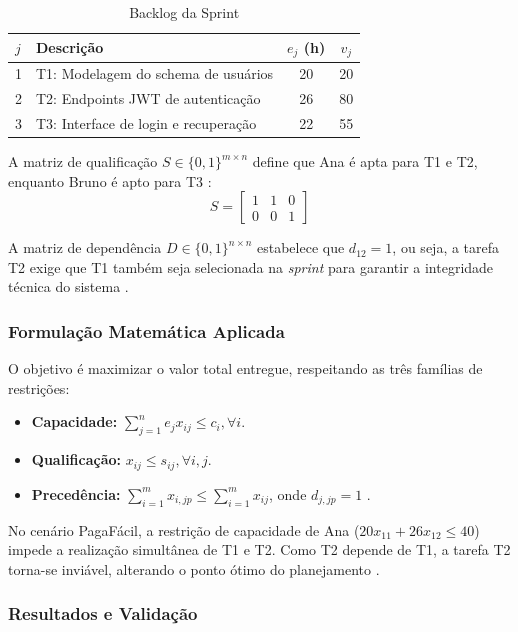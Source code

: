 \documentclass[12pt]{article}
\begin{document}
\begin{table}[h]
\centering
\caption{Backlog da Sprint}
\label{tab:backlog}
\begin{tabular}{llcc}
\hline
$j$ & Descrição & $e_j$ (h) & $v_j$ \\ \hline
1   & T1: Modelagem do schema de usuários & 20        & 20    \\
2   & T2: Endpoints JWT de autenticação   & 26        & 80    \\
3   & T3: Interface de login e recuperação & 22        & 55    \\ \hline
\end{tabular}
\end{table}

A matriz de qualificação $S \in \{0,1\}^{m \times n}$ define que Ana é apta para T1 e T2, enquanto Bruno é apto para T3 \cite{bellenguez2007}:
\[
S = \begin{bmatrix} 1 & 1 & 0 \\ 0 & 0 & 1 \end{bmatrix}
\]

A matriz de dependência $D \in \{0,1\}^{n \times n}$ estabelece que $d_{12}=1$, ou seja, a tarefa T2 exige que T1 também seja selecionada na \textit{sprint} para garantir a integridade técnica do sistema \cite{bagnall2001}.


\subsubsection{Formulação Matemática Aplicada}

O objetivo é maximizar o valor total entregue, respeitando as três famílias de restrições:
\begin{itemize}
    \item \textbf{Capacidade:} $\sum_{j=1}^{n} e_j x_{ij} \leq c_i, \forall i$.
    \item \textbf{Qualificação:} $x_{ij} \leq s_{ij}, \forall i,j$.
    \item \textbf{Precedência:} $\sum_{i=1}^{m} x_{i,jp} \leq \sum_{i=1}^{m} x_{ij}$, onde $d_{j,jp}=1$ \cite{samphaiboon2000}.
\end{itemize}

No cenário PagaFácil, a restrição de capacidade de Ana ($20x_{11} + 26x_{12} \leq 40$) impede a realização simultânea de T1 e T2. Como T2 depende de T1, a tarefa T2 torna-se inviável, alterando o ponto ótimo do planejamento \cite{ruhe2005}.


\subsubsection{Resultados e Validação}
\end{document}

